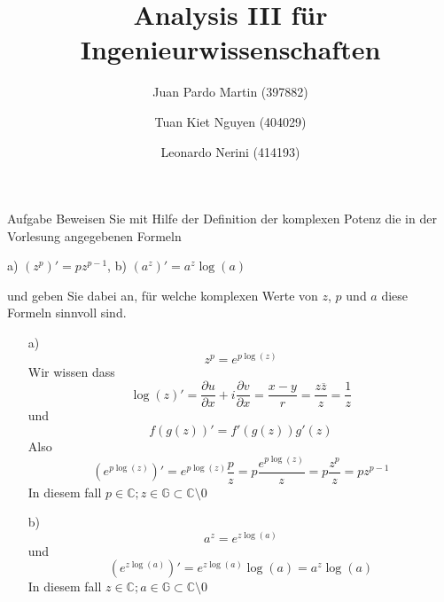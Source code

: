 \documentclass{scrartcl}
\title{Analysis III für Ingenieurwissenschaften}
\author{Juan Pardo Martin (397882)\and Tuan Kiet Nguyen (404029)\and Leonardo Nerini (414193)}
\def\mbb#1{\mathbb{#1}}
\def\bC{\mbb{C}}
\begin{document}
\maketitle

\begin{section}{Aufgabe}%
Beweisen Sie mit Hilfe der Definition der komplexen Potenz die in der Vorlesung angegebenen Formeln
\begin{center}
a) \((z^p)'=p z^{p-1}\),    b) \((a^z)'=a^z \log(a)\)
\end{center}

und geben Sie dabei an, für welche komplexen Werte von $z$, $p$ und $a$ diese Formeln
sinnvoll sind.
\begin{itemize}
\item[a)]
\[z^p=e^{p \log(z)}\]
Wir wissen dass
\[\log(z)'=\frac{\partial u}{\partial x}+i \frac{\partial v}{\partial x}=\frac{x-y}{r}=\frac{z \overline{z}}{z}=\frac{1}{z}\]
und \[f(g(z))'=f'(g(z))g'(z)\]
Also \[(e^{p \log(z)})'=e^{p \log(z)}\frac{p}{z}=p\frac{e^{p \log(z)}}{z}=p\frac{z^p}{z}=p z^{p-1}\]
In diesem fall \(p\in \bC;z\in \mathbb G\subset \mathbb C\setminus\qty{0}\)
\item[b)]
\[a^z=e^{z \log(a)}\]
und
\[(e^{z \log(a)})'=e^{z \log(a)}\log(a)=a^z \log(a)\]
In diesem fall \(z\in \bC;a\in \mathbb G\subset \mathbb C\setminus\qty{0}\)
\end{itemize}
\end{section}
\end{document}
